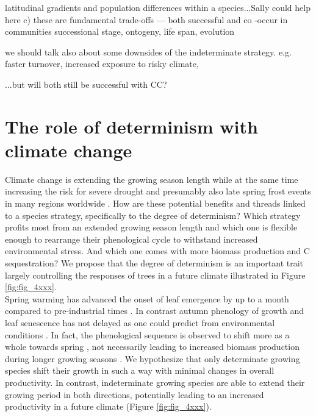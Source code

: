 \documentclass{article}
\begin{document}
latitudinal gradients and population differences within a species...Sally could help here
	c) these are fundamental trade-offs --- both successful and co -occur in communities
	successional stage, ontogeny, life span, evolution
	
	we should talk also about some downsides of the indeterminate strategy. e.g. faster turnover, increased exposure to risky climate, 
	
	...but will both still be successful with CC?
	
\section*{The role of determinism with climate change}
Climate change is extending the growing season length while at the same time increasing the risk for severe drought \citep{haoChangesSeverityCompound2018} and presumably also late spring frost events in many regions worldwide \citep{zohnerLatespringFrostRisk2020}. How are these potential benefits and threads linked to a species strategy, specifically to the degree of determinism? Which strategy profits most from an extended growing season length and which one is flexible enough to rearrange their phenological cycle to withstand increased environmental stress. And which one comes with more biomass production and C sequestration? We propose that the degree of determinism is an important trait largely controlling the responses of trees in a future climate illustrated in Figure \ref{fig:fig_4xxx}. \\

Spring warming has advanced the onset of leaf emergence by up to a month compared to pre-industrial times \citep{vitasseGreatAccelerationPlant2022b}. In contrast autumn phenology of growth and leaf senescence has not delayed as one could predict from environmental conditions \citep{zaniIncreasedGrowingseasonProductivity2020b, zohnerEffectClimateWarming2023}. In fact, the phenological sequence is observed to shift more as a whole towards spring \citep{keenanTimingAutumnSenescence2015b}, not necessarily leading to increased biomass production during longer growing seasons \citep{zaniIncreasedGrowingseasonProductivity2020b}. We hypothesize that only determinate growing species shift their growth in such a way with minimal changes in overall productivity. In contrast, indeterminate growing species are able to extend their growing period in both directions, potentially leading to an increased productivity in a future climate (Figure \ref{fig:fig_4xxx}). \\
\end{document}

